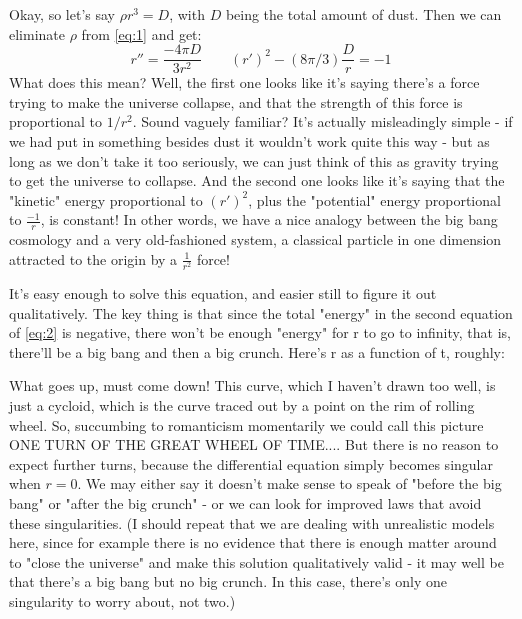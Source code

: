 Okay, so let's say $\rho r^3 = D$, with $D$ being the total amount of dust. Then we can eliminate $\rho$ from \eqref{eq:1} and get:
\begin{equation}\label{eq:2}
    r'' = \frac{-4\pi D}{3r^2} \quad \quad (r')^2 - (8\pi/3) \frac{D}{r} = -1 
\end{equation}
What does this mean? Well, the first one looks like it's saying there's a force trying to make the universe collapse, and that the strength of this force is proportional to $1/r^2$. Sound vaguely familiar? It's actually misleadingly simple - if we had put in something besides dust it wouldn't work quite this way - but as long as we don't take it too seriously, we can just think of this as gravity trying to get the universe to collapse. And the second one looks like it's saying that the "kinetic" energy proportional to $(r')^2$, plus the "potential" energy proportional to $\frac{-1}{r}$, is constant! In other words, we have a nice analogy between the big bang cosmology and a very old-fashioned system, a classical particle in one dimension attracted to the origin by a $\frac{1}{r^2}$ force!

It's easy enough to solve this equation, and easier still to figure it out qualitatively. The key thing is that since the total "energy" in the second equation of \eqref{eq:2} is negative, there won't be enough "energy" for r to go to infinity, that is, there'll be a big bang and then a big crunch. Here's r as a function of t, roughly:

\begin{center}
\end{center}
  
What goes up, must come down! This curve, which I haven't drawn too well, is just a cycloid, which is the curve traced out by a point on the rim of rolling wheel. So, succumbing to romanticism momentarily we could call this picture ONE TURN OF THE GREAT WHEEL OF TIME.... But there is no reason to expect further turns, because the differential equation simply becomes singular when $r = 0$. We may either say it doesn't make sense to speak of "before the big bang" or "after the big crunch" - or we can look for improved laws that avoid these singularities. (I should repeat that we are dealing with unrealistic models here, since for example there is no evidence that there is enough matter around to "close the universe" and make this solution qualitatively valid - it may well be that there's a big bang but no big crunch. In this case, there's only one singularity to worry about, not two.)

